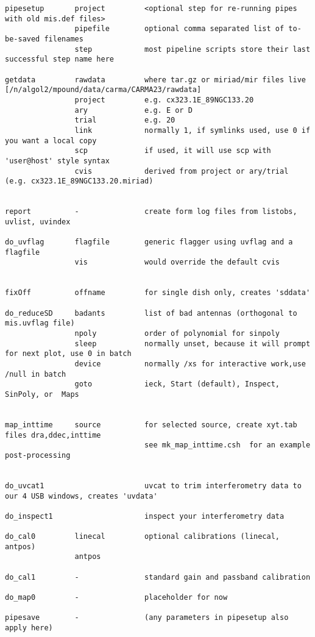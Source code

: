 \documentclass[preprint]{aastex} %
\begin{document}
\footnotesize
\begin{verbatim}
pipesetup       project         <optional step for re-running pipes with old mis.def files>
                pipefile        optional comma separated list of to-be-saved filenames
                step            most pipeline scripts store their last successful step name here

getdata         rawdata         where tar.gz or miriad/mir files live [/n/algol2/mpound/data/carma/CARMA23/rawdata]
                project         e.g. cx323.1E_89NGC133.20
                ary             e.g. E or D
                trial           e.g. 20
                link            normally 1, if symlinks used, use 0 if you want a local copy
                scp             if used, it will use scp with 'user@host' style syntax
                cvis            derived from project or ary/trial (e.g. cx323.1E_89NGC133.20.miriad)


report          -               create form log files from listobs, uvlist, uvindex

do_uvflag       flagfile        generic flagger using uvflag and a flagfile 
                vis             would override the default cvis


fixOff          offname         for single dish only, creates 'sddata'

do_reduceSD     badants         list of bad antennas (orthogonal to mis.uvflag file)
                npoly           order of polynomial for sinpoly
                sleep           normally unset, because it will prompt for next plot, use 0 in batch
                device          normally /xs for interactive work,use /null in batch
                goto            ieck, Start (default), Inspect, SinPoly, or  Maps


map_inttime     source          for selected source, create xyt.tab files dra,ddec,inttime
                                see mk_map_inttime.csh  for an example post-processing


do_uvcat1                       uvcat to trim interferometry data to our 4 USB windows, creates 'uvdata'

do_inspect1                     inspect your interferometry data

do_cal0         linecal         optional calibrations (linecal, antpos)
                antpos

do_cal1         -               standard gain and passband calibration

do_map0         -               placeholder for now

pipesave        -               (any parameters in pipesetup also apply here)

\end{verbatim}
\normalsize
\end{document}
